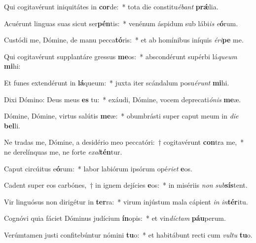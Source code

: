 \item Qui cogitavérunt iniquitátes in \textbf{cor}de:~* tota die constitu\textit{é}\textit{bant} \textbf{prǽ}lia.
\item Acuérunt linguas suas sicut ser\textbf{pén}tis:~* venénum áspidum sub lábi\textit{is} \textit{e}\textbf{ó}rum.
\item Custódi me, Dómine, de manu pecca\textbf{tó}ris:~* et ab homínibus iníquis \textit{é}\textit{ri}\textbf{pe} me.
\item Qui cogitavérunt supplantáre gressus \textbf{me}os:~* abscondérunt supérbi lá\textit{que}\textit{um} \textbf{mi}hi:
\item Et funes extendérunt in \textbf{lá}queum:~* juxta iter scándalum posu\textit{é}\textit{runt} \textbf{mi}hi.
\item Dixi Dómino: Deus meus \textbf{es} tu:~* exáudi, Dómine, vocem deprecati\textit{ó}\textit{nis} \textbf{me}æ.
\item Dómine, Dómine, virtus salútis \textbf{me}æ:~* obumbrásti super caput meum in \textit{di}\textit{e} \textbf{bel}li.
\item Ne tradas me, Dómine, a desidério meo peccatóri:~† cogitavérunt \textbf{con}tra me,~* ne derelínquas me, ne forte \textit{ex}\textit{al}\textbf{tén}tur.
\item Caput circúitus e\textbf{ó}rum:~* labor labiórum ipsórum opé\textit{ri}\textit{et} \textbf{e}os.
\item Cadent super eos carbónes,~† in ignem dejícies \textbf{e}os:~* in misériis \textit{non} \textit{sub}\textbf{sís}tent.
\item Vir linguósus non dirigétur in \textbf{ter}ra:~* virum injústum mala cápient \textit{in} \textit{in}\textbf{tér}itu.
\item Cognóvi quia fáciet Dóminus judícium \textbf{ín}opis:~* et vin\textit{díc}\textit{tam} \textbf{páu}perum.
\item Verúmtamen justi confitebúntur nómini \textbf{tu}o:~* et habitábunt recti cum \textit{vul}\textit{tu} \textbf{tu}o.
